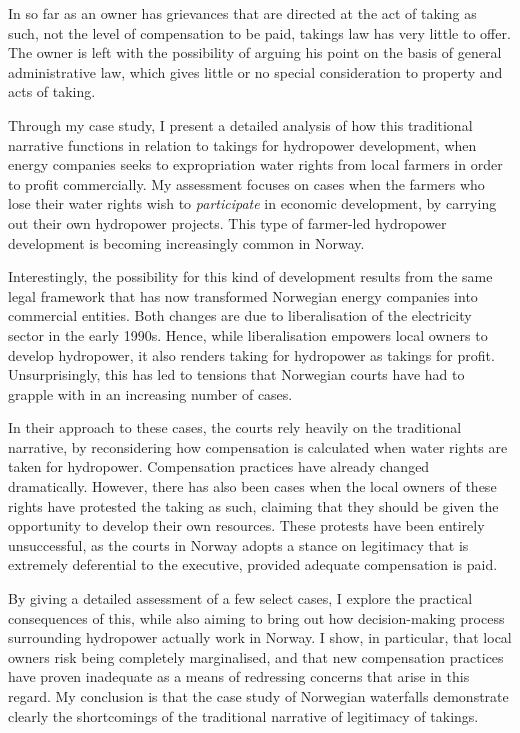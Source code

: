 In so far as an owner has grievances that are directed at the act of taking as such, not the level of compensation to be paid, takings law has very little to offer. The owner is left with the possibility of arguing his point on the basis of general administrative law, which gives little or no special consideration to property and acts of taking. 

Through my case study, I present a detailed analysis of how this traditional narrative functions in relation to takings for hydropower development, when energy companies seeks to expropriation water rights from local farmers in order to profit commercially. My assessment focuses on cases when the farmers who lose their water rights wish to {\it participate} in economic development, by carrying out their own hydropower projects. This type of farmer-led hydropower development is becoming increasingly common in Norway.

Interestingly, the possibility for this kind of development results from the same legal framework that has now transformed Norwegian energy companies into commercial entities. Both changes are due to liberalisation of the electricity sector in the early 1990s. Hence, while liberalisation empowers local owners to develop hydropower, it also renders taking for hydropower as takings for profit. Unsurprisingly, this has led to tensions that Norwegian courts have had to grapple with in an increasing number of cases.

In their approach to these cases, the courts rely heavily on the traditional narrative, by reconsidering how compensation is calculated when water rights are taken for hydropower. Compensation practices have already changed dramatically. However, there has also been cases when the local owners of these rights have protested the taking as such, claiming that they should be given the opportunity to develop their own resources. These protests have been entirely unsuccessful, as the courts in Norway adopts a stance on legitimacy that is extremely deferential to the executive, provided adequate compensation is paid.

By giving a detailed assessment of a few select cases, I explore the practical consequences of this, while also aiming to bring out how decision-making process surrounding hydropower actually work in Norway. I show, in particular, that local owners risk being completely marginalised, and that new compensation practices have proven inadequate as a means of redressing concerns that arise in this regard. My conclusion is that the case study of Norwegian waterfalls demonstrate clearly the shortcomings of the traditional narrative of legitimacy of takings.

